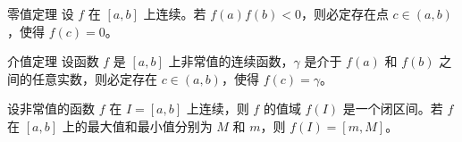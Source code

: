 \begin{theorem}{零值定理}
  设 $f$ 在 $[a, b]$ 上连续。若 $f(a)f(b) < 0$，则必定存在点 $c \in (a, b)$，使得 $f(c) = 0$。
\end{theorem}

\begin{theorem}{介值定理}
  设函数 $f$ 是 $[a, b]$ 上非常值的连续函数，$\gamma$ 是介于 $f(a)$ 和 $f(b)$ 之间的任意实数，则必定存在 $c \in (a, b)$，使得 $f(c) = \gamma$。
\end{theorem}

\begin{corollary}
  设非常值的函数 $f$ 在 $I = [a, b]$ 上连续，则 $f$ 的值域 $f(I)$ 是一个闭区间。若 $f$ 在 $[a, b]$ 上的最大值和最小值分别为 $M$ 和 $m$，则 $f(I) = [m, M]$。
\end{corollary}





